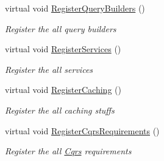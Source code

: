\begin{DoxyCompactItemize}
virtual void \hyperlink{classCqrs_1_1Ninject_1_1Configuration_1_1CqrsModule_afc0f6417f69d5424fe7bba7a6724970f_afc0f6417f69d5424fe7bba7a6724970f}{Register\+Query\+Builders} ()
\begin{DoxyCompactList}\small\item\em Register the all query builders \end{DoxyCompactList}\item 
virtual void \hyperlink{classCqrs_1_1Ninject_1_1Configuration_1_1CqrsModule_ac6f0db82440e24190a5692d352fb4524_ac6f0db82440e24190a5692d352fb4524}{Register\+Services} ()
\begin{DoxyCompactList}\small\item\em Register the all services \end{DoxyCompactList}\item 
virtual void \hyperlink{classCqrs_1_1Ninject_1_1Configuration_1_1CqrsModule_a6ca61a712ab7efc28eb38e7f74853e3e_a6ca61a712ab7efc28eb38e7f74853e3e}{Register\+Caching} ()
\begin{DoxyCompactList}\small\item\em Register the all caching stuffs \end{DoxyCompactList}\item 
virtual void \hyperlink{classCqrs_1_1Ninject_1_1Configuration_1_1CqrsModule_a61a20168f5dc9dab74bb2f7fad7c0adb_a61a20168f5dc9dab74bb2f7fad7c0adb}{Register\+Cqrs\+Requirements} ()
\begin{DoxyCompactList}\small\item\em Register the all \hyperlink{namespaceCqrs}{Cqrs} requirements \end{DoxyCompactList}\end{DoxyCompactItemize}
